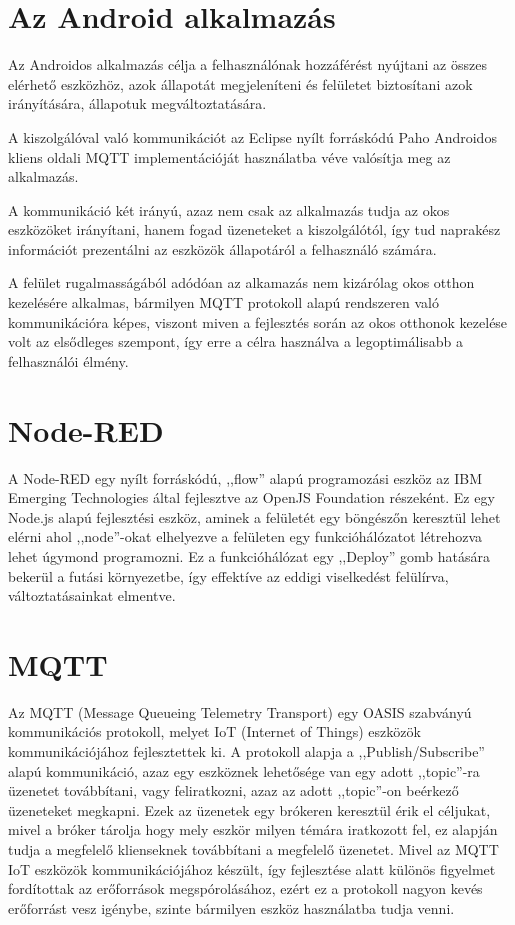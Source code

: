 \documentclass[
]{thesis-ekf}
\theoremstyle{definition}
\theoremstyle{remark}
\begin{document}
\section{Az Android alkalmazás}
Az Androidos alkalmazás célja a felhasználónak hozzáférést nyújtani az összes elérhető eszközhöz, 
azok állapotát megjeleníteni és felületet biztosítani azok irányítására, állapotuk megváltoztatására. 

A kiszolgálóval való kommunikációt az Eclipse nyílt forráskódú Paho\cite{paho} Androidos kliens oldali MQTT implementációját használatba véve valósítja meg az alkalmazás. 

A kommunikáció két irányú, azaz nem csak az alkalmazás tudja az okos eszközöket irányítani, 
hanem fogad üzeneteket a kiszolgálótól, így tud naprakész információt prezentálni az eszközök állapotáról a felhasználó számára.

A felület rugalmasságából adódóan az alkamazás nem kizárólag okos otthon kezelésére alkalmas, bármilyen MQTT protokoll alapú rendszeren való kommunikációra képes,
viszont miven a fejlesztés során az okos otthonok kezelése volt az elsődleges szempont, így erre a célra használva a legoptimálisabb a felhasználói élmény.

\section{Node-RED}
A Node-RED egy nyílt forráskódú, ,,flow'' alapú programozási eszköz az IBM Emerging Technologies\cite{ibmET} által fejlesztve az OpenJS Foundation\cite{openjs} részeként. 
Ez egy Node.js alapú fejlesztési eszköz, aminek a felületét egy böngészőn keresztül lehet elérni ahol ,,node''-okat elhelyezve a felületen  egy funkcióhálózatot létrehozva lehet úgymond programozni. 
Ez a funkcióhálózat egy ,,Deploy'' gomb hatására bekerül a futási környezetbe, így effektíve az eddigi viselkedést felülírva, változtatásainkat elmentve.

\section{MQTT}
Az MQTT (Message Queueing Telemetry Transport)\cite{mqtt} egy OASIS szabványú kommunikációs protokoll, 
melyet IoT (Internet of Things) eszközök kommunikációjához fejlesztettek ki. 
A protokoll alapja a ,,Publish/Subscribe'' alapú kommunikáció, azaz egy eszköznek lehetősége van egy adott ,,topic''-ra üzenetet továbbítani, 
vagy feliratkozni, azaz az adott ,,topic''-on beérkező üzeneteket megkapni. Ezek az üzenetek egy brókeren keresztül érik el céljukat, 
mivel a bróker tárolja hogy mely eszkör milyen témára iratkozott fel, ez alapján tudja a megfelelő klienseknek továbbítani a megfelelő üzenetet. 
Mivel az MQTT IoT eszközök kommunikációjához készült, így fejlesztése alatt különös figyelmet fordítottak az erőforrások megspórolásához, 
ezért ez a protokoll nagyon kevés erőforrást vesz igénybe, szinte bármilyen eszköz használatba tudja venni.
\end{document}
